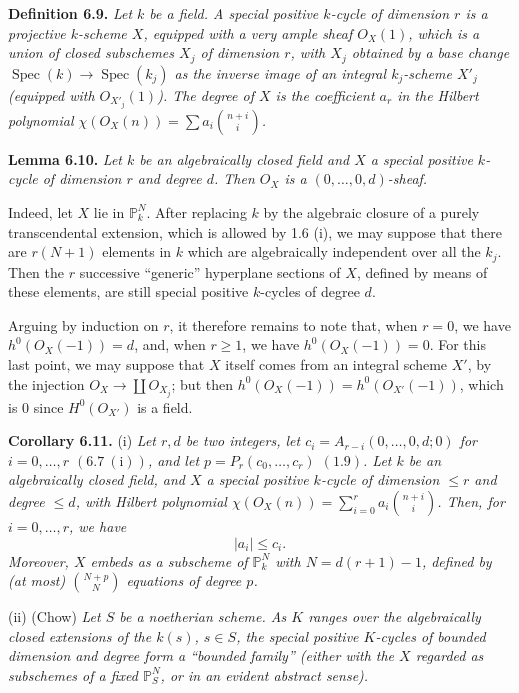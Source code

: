 \textbf{Definition 6.9.} \emph{Let $k$ be a field. A \emph{special positive $k$-cycle of dimension $r$} is a projective $k$-scheme $X$, equipped with a very ample sheaf ${O}_X(1)$, which is a union of closed subschemes $X_j$ of dimension $r$, with $X_j$ obtained by a base change $\operatorname{Spec}(k)\to\operatorname{Spec}(k_j)$ as the inverse image of an \emph{integral} $k_j$-scheme $X'_j$ (equipped with ${O}_{X'_j}(1)$). The \emph{degree} of $X$ is the coefficient $a_r$ in the Hilbert polynomial $\chi({O}_X(n))=\sum a_i\binom{n+i}{i}$.}

\textbf{Lemma 6.10.} \emph{Let $k$ be an algebraically closed field and $X$ a special positive $k$-cycle of dimension $r$ and degree $d$. Then ${O}_X$ is a $(0,\ldots,0,d)$-sheaf.}

%
Indeed, let $X$ lie in $\mathbb P^N_k$. After replacing $k$ by the algebraic closure of a purely transcendental extension, which is allowed by 1.6 (i), we may suppose that there are $r(N+1)$ elements in $k$ which are algebraically independent over all the $k_j$. Then the $r$ successive ``generic'' hyperplane sections of $X$, defined by means of these elements, are still special positive $k$-cycles of degree $d$.

Arguing by induction on $r$, it therefore remains to note that, when $r=0$, we have $h^0({O}_X(-1))=d$, and, when $r\ge1$, we have $h^0({O}_X(-1))=0$. For this last point, we may suppose that $X$ itself comes from an integral scheme $X'$, by the injection ${O}_X\to \coprod{O}_{X_j}$; but then $h^0({O}_X(-1))=h^0({O}_{X'}(-1))$, which is $0$ since $H^0({O}_{X'})$ is a field.

\textbf{Corollary 6.11.} (i) \emph{Let $r,d$ be two integers, let $c_i=A_{r-i}(0,\ldots,0,d;0)$ for $i=0,\ldots,r$ $(6.7\ \mathrm{(i)})$, and let $p=P_r(c_0,\ldots,c_r)$ $(1.9)$. Let $k$ be an algebraically closed field, and $X$ a special positive $k$-cycle of dimension $\le r$ and degree $\le d$, with Hilbert polynomial $\chi({O}_X(n))=\sum_{i=0}^{r}a_i\binom{n+i}{i}$. Then, for $i=0,\ldots,r$, we have}
\[
   |a_i|\le c_i.
\]
\emph{Moreover, $X$ embeds as a subscheme of $\mathbb P^N_k$ with $N=d(r+1)-1$, defined by (at most) $\binom{N+p}{N}$ equations of degree $p$.}

(ii) (Chow) \emph{Let $S$ be a noetherian scheme. As $K$ ranges over the algebraically closed extensions of the $k(s)$, $s\in S$, the special positive $K$-cycles of bounded dimension and degree form a ``bounded family'' (either with the $X$ regarded as subschemes of a fixed $\mathbb P^N_S$, or in an evident abstract sense).}

